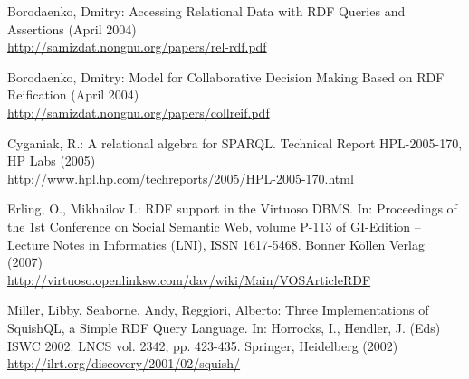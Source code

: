 \documentclass[conference,letterpaper]{IEEEtran}
\begin{document}
\begin{thebibliography}{19}

Borodaenko, Dmitry:
Accessing Relational Data with RDF Queries and Assertions (April 2004)\\
\url{http://samizdat.nongnu.org/papers/rel-rdf.pdf}

Borodaenko, Dmitry:
Model for Collaborative Decision Making Based on RDF Reification (April
2004)\\
\url{http://samizdat.nongnu.org/papers/collreif.pdf}

Cyganiak, R.:
A relational algebra for SPARQL. Technical Report HPL-2005-170, HP Labs
(2005)\\
\url{http://www.hpl.hp.com/techreports/2005/HPL-2005-170.html}

Erling, O., Mikhailov I.:
RDF support in the Virtuoso DBMS. In: Proceedings of the 1st Conference
on Social Semantic Web, volume P-113 of GI-Edition -- Lecture Notes in
Informatics (LNI), ISSN 1617-5468. Bonner K\"{o}llen Verlag (2007)\\
\url{http://virtuoso.openlinksw.com/dav/wiki/Main/VOSArticleRDF}





Miller, Libby, Seaborne, Andy, Reggiori, Alberto:
Three Implementations of SquishQL, a Simple RDF Query Language. In:
Horrocks, I., Hendler, J. (Eds) ISWC 2002. LNCS vol. 2342, pp. 423-435.
Springer, Heidelberg (2002)\\
\url{http://ilrt.org/discovery/2001/02/squish/}


\end{thebibliography}
\end{document}
